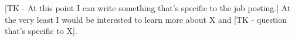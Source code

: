 \documentclass[12pt,a4paper,sans]{moderncv}        %
\begin{document}
[TK - At this point I can write something that's specific to the job posting.] At the very least I would be interested to learn more about X and [TK - question that's specific to X]. 

\makeletterclosing

\end{document}
